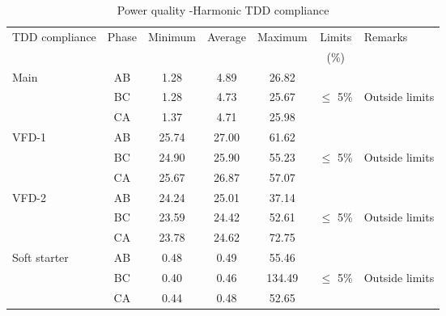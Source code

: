 \begin{table}[!htb]
	\caption{Power quality -Harmonic TDD compliance}
	\label{tbl_ch04_elecaudit_powerquality_tddcompliance}
	{\scriptsize
		
		\begin{tabular}{l|c|c|c|c|c|l}
TDD compliance & Phase & Minimum & Average & Maximum & Limits & Remarks \\ 
&  &  &  &  & (\%) &  \\ 
\hline
Main & AB & 1.28 & 4.89 & 26.82 &  &  \\ 
& BC & 1.28 & 4.73 & 25.67 & $\leq$ 5\% & Outside limits \\ 
& CA & 1.37 & 4.71 & 25.98 &  &  \\ 
\hline
VFD-1 & AB & 25.74 & 27.00 & 61.62 &  &  \\ 
& BC & 24.90 & 25.90 & 55.23 & $\leq$ 5\% & Outside limits \\ 
& CA & 25.67 & 26.87 & 57.07 &  &  \\ 
\hline
VFD-2 & AB & 24.24 & 25.01 & 37.14 &  &  \\ 
& BC & 23.59 & 24.42 & 52.61 & $\leq$ 5\% & Outside limits \\ 
& CA & 23.78 & 24.62 & 72.75 &  &  \\ 
\hline
Soft starter & AB & 0.48 & 0.49 & 55.46 &  &  \\ 
& BC & 0.40 & 0.46 & 134.49 & $\leq$ 5\% & Outside limits \\ 
& CA & 0.44 & 0.48 & 52.65 &  &  \\ 
\hline
		\end{tabular}
		
	}%
\end{table}
